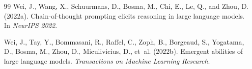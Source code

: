 \documentclass[10pt,twocolumn]{article}
\begin{document}
\begin{thebibliography}{99}
Wei, J., Wang, X., Schuurmans, D., Bosma, M., Chi, E., Le, Q., and Zhou, D.
  (2022a).
\newblock Chain-of-thought prompting elicits reasoning in large language models.
\newblock In \emph{NeurIPS 2022}.

Wei, J., Tay, Y., Bommasani, R., Raffel, C., Zoph, B., Borgeaud, S., Yogatama,
  D., Bosma, M., Zhou, D., Miculivicius, D., et~al. (2022b).
\newblock Emergent abilities of large language models.
\newblock \emph{Transactions on Machine Learning Research}.

\end{thebibliography}
\end{document}
